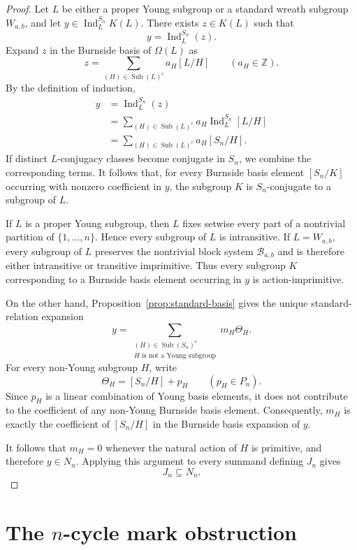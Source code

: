 \documentclass[a4paper,11pt]{article}
\numberwithin{equation}{section}
\newcommand{\Z}{\mathbb{Z}}
\newcommand{\Ind}{\operatorname{Ind}}
\begin{document}
\begin{proof}
Let $L$ be either a proper Young subgroup or a standard wreath subgroup
$W_{a,b}$, and let $y\in\Ind_L^{S_n}K(L)$. There exists $z\in K(L)$ such that
\[
  y=\Ind_L^{S_n}(z).
\]
Expand $z$ in the Burnside basis of $\Omega(L)$ as
\[
  z
  =
  \sum_{(H)\in\operatorname{Sub}(L)^c}
  a_H[L/H]
  \qquad
  (a_H\in\Z).
\]
By the definition of induction,
\[
\begin{aligned}
  y
  &=
  \Ind_L^{S_n}(z)\\
  &=
  \sum_{(H)\in\operatorname{Sub}(L)^c}
  a_H\Ind_L^{S_n}[L/H]\\
  &=
  \sum_{(H)\in\operatorname{Sub}(L)^c}
  a_H[S_n/H].
\end{aligned}
\]
If distinct $L$-conjugacy classes become conjugate in $S_n$, we combine the
corresponding terms. It follows that, for every Burnside basis element
$[S_n/K]$ occurring with nonzero coefficient in $y$, the subgroup $K$ is
$S_n$-conjugate to a subgroup of $L$.

If $L$ is a proper Young subgroup, then $L$ fixes setwise every part of a
nontrivial partition of $\{1,\ldots,n\}$. Hence every subgroup of $L$ is
intransitive. If $L=W_{a,b}$, every subgroup of $L$ preserves the nontrivial
block system $\mathcal B_{a,b}$ and is therefore either intransitive or
transitive imprimitive. Thus every subgroup $K$ corresponding to a Burnside
basis element occurring in $y$ is action-imprimitive.

On the other hand, Proposition~\ref{prop:standard-basis} gives the unique
standard-relation expansion
\[
  y
  =
  \sum_{\substack{(H)\in\operatorname{Sub}(S_n)^c\\
          H\text{ is not a Young subgroup}}}
  m_H\Theta_H.
\]
For every non-Young subgroup $H$, write
\[
  \Theta_H=[S_n/H]+p_H
  \qquad
  (p_H\in P_n).
\]
Since $p_H$ is a linear combination of Young basis elements, it does not
contribute to the coefficient of any non-Young Burnside basis element.
Consequently, $m_H$ is exactly the coefficient of $[S_n/H]$ in the Burnside
basis expansion of $y$.

It follows that $m_H=0$ whenever the natural action of $H$ is primitive, and
therefore $y\in N_n$. Applying this argument to every summand defining $J_n$
gives
\[
  J_n\subseteq N_n.
\]
\end{proof}


\section{The \texorpdfstring{$n$}{n}-cycle mark obstruction}\label{sec:ncycle}
\end{document}
